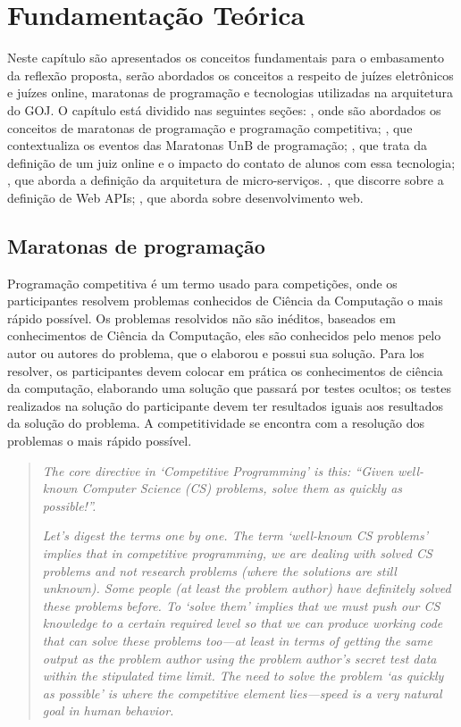 \chapter[Fundamentação Teórica]{Fundamentação Teórica}
\label{chap:ft}

Neste capítulo são apresentados os conceitos fundamentais para o embasamento da reflexão proposta, serão abordados os conceitos a respeito de juízes eletrônicos e juízes online, maratonas de programação e tecnologias utilizadas na arquitetura do GOJ. O capítulo está dividido nas seguintes seções: , onde são abordados os conceitos de maratonas de programação e programação competitiva; , que contextualiza os eventos das Maratonas UnB de programação; , que trata da definição de um juiz online e o impacto do contato de alunos com essa tecnologia; , que aborda a definição da arquitetura de micro-serviços. , que discorre sobre a definição de Web APIs; , que aborda sobre desenvolvimento web. 


\section{Maratonas de programação}
\label{sec:maratonasDeProgramação}

Programação competitiva é um termo usado para competições, onde os participantes resolvem problemas conhecidos de Ciência da Computação o mais rápido possível. Os problemas resolvidos não são inéditos, baseados em conhecimentos de Ciência da Computação, eles são conhecidos pelo menos pelo autor ou autores do problema, que o elaborou e possui sua solução. Para los resolver, os participantes devem colocar em prática os conhecimentos de ciência da computação, elaborando uma solução que passará por testes ocultos; os testes realizados na solução do participante devem ter resultados iguais aos resultados da solução do problema. A competitividade se encontra com a resolução dos problemas o mais rápido possível.

\begin{quote}

\textit{The core directive in ‘Competitive Programming’ is this: “Given well-known Computer Science (CS) problems, solve them as quickly as possible!”.}

\textit{Let’s digest the terms one by one. The term ‘well-known CS problems’ implies that in competitive programming, we are dealing with solved CS problems and not research problems (where the solutions are still unknown). Some people (at least the problem author) have definitely solved these problems before. To ‘solve them’ implies that we must push our CS knowledge to a certain required level so that we can produce working code that can solve these problems too—at least in terms of getting the same output as the problem author using the problem author’s secret test data within the stipulated time limit. The need to solve the problem ‘as quickly as possible’ is where the competitive element lies—speed is a very natural goal in human behavior.}
\cite[p.1]{halim2013competitive}
\end{quote}

